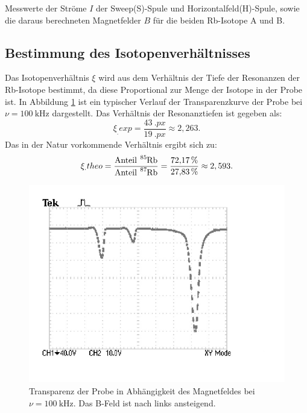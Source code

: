 \begin{table}
	\centering
	\caption{Messwerte der Ströme $I$ der Sweep(S)-Spule und Horizontalfeld(H)-Spule, sowie die daraus berechneten Magnetfelder $B$ für die beiden Rb-Isotope A und B.}
	
	
	\label{tab:messung1}
\end{table}

\subsection{Bestimmung des Isotopenverhältnisses}

Das Isotopenverhältnis $\xi$ wird aus dem Verhältnis der Tiefe der Resonanzen der Rb-Isotope bestimmt, da diese Proportional zur Menge der Isotope in der Probe ist. In Abbildung \ref{fig:typisch} ist ein typischer Verlauf der Transparenzkurve der Probe bei $\nu=\SI{100}{\kilo\hertz}$ dargestellt.
Das Verhältnis der Resonanztiefen ist gegeben als:
\[
\xi_.{exp} = \frac{\SI{43}{.{px}}}{\SI{19}{.{px}}} \approx 2,263 \text{.}
\]
Das in der Natur vorkommende Verhältnis ergibt sich zu:
\[
\xi_.{theo} = \frac{\text{Anteil}~ \ce{^{85}Rb}}{\text{Anteil}~ \ce{^{87}Rb}}=\frac{\SI{72,17}{\%}}{\SI{27,83}{\%}} \approx 2,593 \text{.}
\]
\begin{figure}
	\centering
	\includegraphics[width=\linewidth-60pt,height=\textheight-60pt,keepaspectratio]{content/images/TEK0006.pdf}
	\caption{Transparenz der Probe in Abhängigkeit des Magnetfeldes bei $\nu=\SI{100}{\kilo\hertz}$. Das B-Feld ist nach links ansteigend.}
	\label{fig:typisch}
\end{figure}

